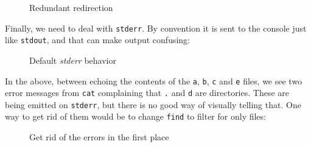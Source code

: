 \documentclass[10pt,american,]{book}
\newenvironment{Shaded}{\begin{snugshade}}{\end{snugshade}}
\newcommand{\KeywordTok}[1]{\textcolor[rgb]{0.13,0.29,0.53}{\textbf{{#1}}}}
\newcommand{\DataTypeTok}[1]{\textcolor[rgb]{0.13,0.29,0.53}{{#1}}}
\newcommand{\NormalTok}[1]{{#1}}
\numberwithin{figure}{chapter}
\DeclareRobustCommand{\drcap}[1]{\begin{figure}[H]\caption{#1}\end{figure}}
\renewcommand{\KeywordTok}[1]{{#1}}
\renewcommand{\DataTypeTok}[1]{{#1}}
\renewcommand{\NormalTok}[1]{{#1}}
\begin{document}
\drcap{Redundant redirection}

\begin{Shaded}
\end{Shaded}

Finally, we need to deal with
\texttt{stderr}. By convention
it is sent to the console just like \texttt{stdout}, and that can make
output confusing:

\drcap{Default \textit{stderr} behavior}

\begin{Shaded}
\end{Shaded}

In the above, between echoing the contents of the \texttt{a},
\texttt{b}, \texttt{c} and \texttt{e} files, we see two error messages
from \texttt{cat} complaining that \texttt{.} and \texttt{d} are
directories. These are being emitted on \texttt{stderr}, but there is no
good way of visually telling that. One way to get rid of them would be
to change \texttt{find} to filter for only files:

\drcap{Get rid of the errors in the first place}

\begin{Shaded}
\end{Shaded}
\end{document}

